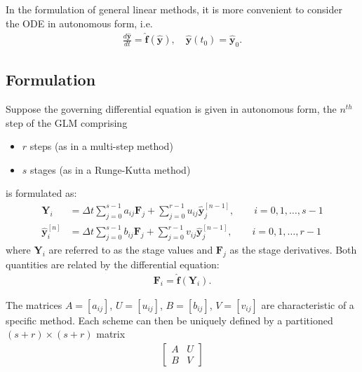 In the formulation of general linear methods, it is more convenient to consider
the ODE in autonomous form, i.e.
\begin{align*}
\frac{d\boldsymbol{\hat{y}}}{dt}=\boldsymbol{\hat{f}}(\boldsymbol{\hat{y}}),\quad
\boldsymbol{\hat{y}}(t_0)= \boldsymbol{\hat{y}}_0.
\end{align*}

\subsection{Formulation}
Suppose the governing differential equation is given in autonomous form, the
$n^{th}$ step of the GLM comprising
\begin{itemize}
\item $r$ steps (as in a multi-step method)
\item $s$ stages (as in a Runge-Kutta method)
\end{itemize}
is formulated as:
\begin{align*}
\boldsymbol{Y}_i &= \Delta
t\sum_{j=0}^{s-1}a_{ij}\boldsymbol{F}_j+\sum_{j=0}^{r-1}u_{ij}\boldsymbol{\hat{y}}_{j}^{[n-1]},
\qquad i=0,1,\ldots,s-1 \\
\boldsymbol{\hat{y}}_{i}^{[n]}&=\Delta
t\sum_{j=0}^{s-1}b_{ij}\boldsymbol{F}_j+\sum_{j=0}^{r-1}v_{ij}
\boldsymbol{\hat{y}}_{j}^{[n-1]}, \qquad i=0,1,\ldots,r-1
\end{align*}
where $\boldsymbol{Y}_i$ are referred to as the stage values and
$\boldsymbol{F}_j$ as the stage derivatives. Both quantities are
related by the differential equation:
\begin{align*}
\boldsymbol{F}_i = \boldsymbol{\hat{f}}(\boldsymbol{Y}_i).
\end{align*}

The matrices $A=[a_{ij}]$, $U=[u_{ij}]$,
$B=[b_{ij}]$, $V=[v_{ij}]$ are characteristic of a
specific method. Each scheme can then be uniquely defined by a partitioned
$(s+r)\times(s+r)$ matrix
\begin{align*}
\left[
\begin{array}{cc}
  A & U\\
  B & V \end{array}\right]
\end{align*}


